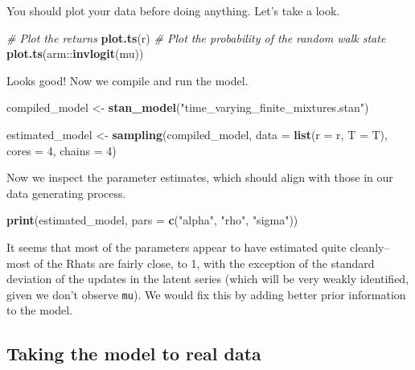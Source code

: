 \documentclass[]{book}
\newenvironment{Shaded}{\begin{snugshade}}{\end{snugshade}}
\newcommand{\KeywordTok}[1]{\textcolor[rgb]{0.13,0.29,0.53}{\textbf{{#1}}}}
\newcommand{\DataTypeTok}[1]{\textcolor[rgb]{0.13,0.29,0.53}{{#1}}}
\newcommand{\DecValTok}[1]{\textcolor[rgb]{0.00,0.00,0.81}{{#1}}}
\newcommand{\StringTok}[1]{\textcolor[rgb]{0.31,0.60,0.02}{{#1}}}
\newcommand{\CommentTok}[1]{\textcolor[rgb]{0.56,0.35,0.01}{\textit{{#1}}}}
\newcommand{\NormalTok}[1]{{#1}}
\begin{document}
You should plot your data before doing anything. Let's take a look.

\begin{Shaded}
\begin{Highlighting}[]
\CommentTok{# Plot the returns}
\KeywordTok{plot.ts}\NormalTok{(r)}
\CommentTok{# Plot the probability of the random walk state}
\KeywordTok{plot.ts}\NormalTok{(arm::}\KeywordTok{invlogit}\NormalTok{(mu))}
\end{Highlighting}
\end{Shaded}

Looks good! Now we compile and run the model.

\begin{Shaded}
\begin{Highlighting}[]
\NormalTok{compiled_model <-}\StringTok{ }\KeywordTok{stan_model}\NormalTok{(}\StringTok{"time_varying_finite_mixtures.stan"}\NormalTok{)}

\NormalTok{estimated_model <-}\StringTok{ }\KeywordTok{sampling}\NormalTok{(compiled_model, }\DataTypeTok{data =} \KeywordTok{list}\NormalTok{(}\DataTypeTok{r =} \NormalTok{r, }\DataTypeTok{T =} \NormalTok{T), }\DataTypeTok{cores =} \DecValTok{4}\NormalTok{, }\DataTypeTok{chains =} \DecValTok{4}\NormalTok{)}
\end{Highlighting}
\end{Shaded}

Now we inspect the parameter estimates, which should align with those in
our data generating process.

\begin{Shaded}
\begin{Highlighting}[]
\KeywordTok{print}\NormalTok{(estimated_model, }\DataTypeTok{pars =} \KeywordTok{c}\NormalTok{(}\StringTok{"alpha"}\NormalTok{, }\StringTok{"rho"}\NormalTok{, }\StringTok{"sigma"}\NormalTok{))}
\end{Highlighting}
\end{Shaded}

It seems that most of the parameters appear to have estimated quite
cleanly--most of the Rhats are fairly close, to 1, with the exception of
the standard deviation of the updates in the latent series (which will
be very weakly identified, given we don't observe \texttt{mu}). We would
fix this by adding better prior information to the model.

\subsection{Taking the model to real
data}\label{taking-the-model-to-real-data}
\end{document}
